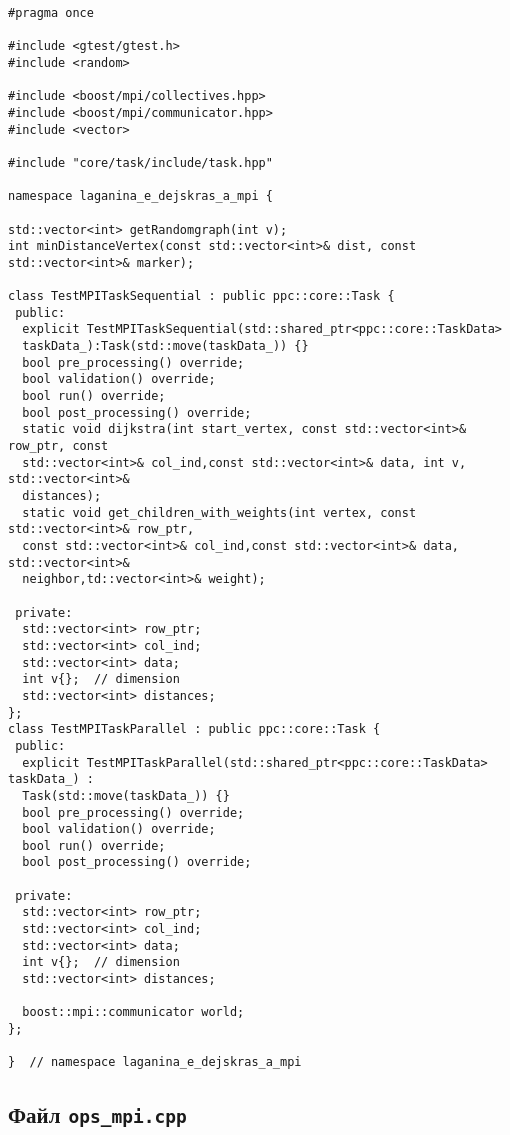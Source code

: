 \documentclass[12pt]{article}
\begin{document}
\begin{verbatim}
#pragma once

#include <gtest/gtest.h>
#include <random>

#include <boost/mpi/collectives.hpp>
#include <boost/mpi/communicator.hpp>
#include <vector>

#include "core/task/include/task.hpp"

namespace laganina_e_dejskras_a_mpi {

std::vector<int> getRandomgraph(int v);
int minDistanceVertex(const std::vector<int>& dist, const std::vector<int>& marker);

class TestMPITaskSequential : public ppc::core::Task {
 public:
  explicit TestMPITaskSequential(std::shared_ptr<ppc::core::TaskData> 
  taskData_):Task(std::move(taskData_)) {}
  bool pre_processing() override;
  bool validation() override;
  bool run() override;
  bool post_processing() override;
  static void dijkstra(int start_vertex, const std::vector<int>& row_ptr, const 
  std::vector<int>& col_ind,const std::vector<int>& data, int v, std::vector<int>& 
  distances);
  static void get_children_with_weights(int vertex, const std::vector<int>& row_ptr, 
  const std::vector<int>& col_ind,const std::vector<int>& data, std::vector<int>& 
  neighbor,td::vector<int>& weight);

 private:
  std::vector<int> row_ptr;
  std::vector<int> col_ind;
  std::vector<int> data;
  int v{};  // dimension
  std::vector<int> distances;
};
class TestMPITaskParallel : public ppc::core::Task {
 public:
  explicit TestMPITaskParallel(std::shared_ptr<ppc::core::TaskData> taskData_) : 
  Task(std::move(taskData_)) {}
  bool pre_processing() override;
  bool validation() override;
  bool run() override;
  bool post_processing() override;

 private:
  std::vector<int> row_ptr;
  std::vector<int> col_ind;
  std::vector<int> data;
  int v{};  // dimension
  std::vector<int> distances;

  boost::mpi::communicator world;
};

}  // namespace laganina_e_dejskras_a_mpi
\end{verbatim}

\subsection*{Файл \texttt{ops\_mpi.cpp}}
\end{document}
